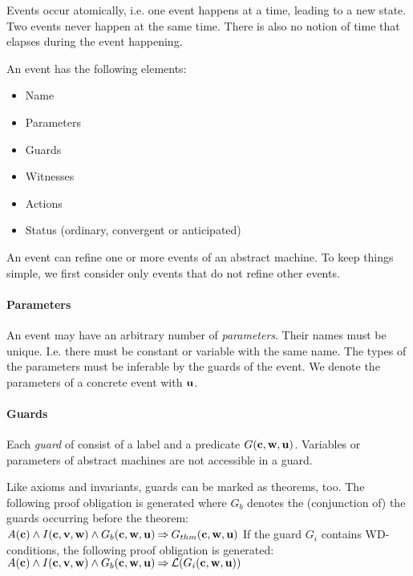 Events occur atomically, i.e. one event happens at a time, leading to a new state.
Two events never happen at the same time. There is also no notion of time that elapses
during the event happening.

An event has the following elements:
\begin{itemize}
\item Name
\item Parameters
\item Guards
\item Witnesses
\item Actions
\item Status (ordinary, convergent or anticipated)
\end{itemize}

An event can refine one or more events of an abstract machine. To keep things simple, we
  first consider only events that do not refine other events.

\paragraph{Parameters}
An event may have an arbitrary number of \emph{parameters}. Their names must be unique. 
I.e. there must be constant or variable with the same name.
The types of the parameters must be inferable by the guards of the event.
We denote the parameters of a concrete event with $\textbf{u}$.

\paragraph{Guards}
Each \emph{guard} of consist of a label and a predicate $G(\textbf{c},\textbf{w},\textbf{u})$.
Variables or parameters of abstract machines are not accessible in a guard.

Like axioms and invariants, guards can be marked as theorems, too. The following
proof obligation is generated where $G_b$ denotes the (conjunction of) the guards occurring before the theorem:
%
{$A(\textbf{c}) \land I(\textbf{c},\textbf{v},\textbf{w}) \land G_b(\textbf{c},\textbf{w},\textbf{u}) 
\mathbin\Rightarrow G_{thm}(\textbf{c},\textbf{w},\textbf{u})$}
If the guard $G_i$ contains WD-conditions, the following proof obligation is generated:
%
{$A(\textbf{c}) \land I(\textbf{c},\textbf{v},\textbf{w}) \land G_b(\textbf{c},\textbf{w},\textbf{u}) 
\mathbin\Rightarrow \mathcal{L}(G_i(\textbf{c},\textbf{w},\textbf{u}))$}

